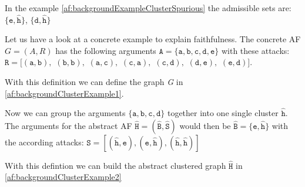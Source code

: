 In the example \ref{af:backgroundExampleClusterSpurious} the admissible sets are:
$\mathtt{\{e, \hat{h}}\}$,
$\mathtt{\{d, \hat{h}}\}$

\vspace{0.5cm}
\noindent
Let us have a look at a concrete example to explain faithfulness. The concrete AF $G = (A, R)$ has the following arguments $\mathtt{A=\{a, b, c, d, e\}}$ with these attacks:
$\mathtt{R=[(a,b),}$
$\mathtt{(b,b),}$
$\mathtt{(a,c),}$
$\mathtt{(c,a),}$
$\mathtt{(c,d),}$
$\mathtt{(d,e),}$
$\mathtt{(e,d)]}$.

With this definition we can define the graph \textit{G} in \ref{af:backgroundClusterExample1}.

Now we can group the arguments $\mathtt{\{a, b, c, d\}}$ together into one single cluster $\mathtt{\hat{h}}$. The arguments for the abstract AF $\mathtt{\hat{H} = (\hat{B}, \hat{S})}$ would then be $\mathtt{\hat{B}=\{e, \hat{h}\}}$ with the according attacks:
$\mathtt{\hat{S}=[(\hat{h}, e), (e, \hat{h}), (\hat{h}, \hat{h})]}$

With this defintion we can build the abstract clustered graph $\mathtt{\hat{H}}$ in \ref{af:backgroundClusterExample2}


